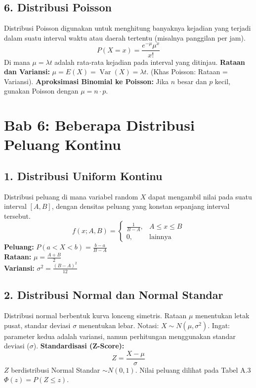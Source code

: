 \documentclass[12pt, a4paper]{article}
\begin{document}
\subsection{6. Distribusi Poisson}
Distribusi Poisson digunakan untuk menghitung banyaknya kejadian yang terjadi dalam suatu interval waktu atau daerah tertentu (misalnya panggilan per jam).
$$P(X=x) = \frac{e^{-\mu} \mu^x}{x!}$$
Di mana $\mu = \lambda t$ adalah rata-rata kejadian pada interval yang ditinjau.
\textbf{Rataan dan Variansi:} $\mu = E(X) = \operatorname{Var}(X) = \lambda t$. (Khas Poisson: Rataan = Variansi).
\textbf{Aproksimasi Binomial ke Poisson:} Jika $n$ besar dan $p$ kecil, gunakan Poisson dengan $\mu = n \cdot p$.

\newpage
\section{Bab 6: Beberapa Distribusi Peluang Kontinu}

\subsection{1. Distribusi Uniform Kontinu}
Distribusi peluang di mana variabel random $X$ dapat mengambil nilai pada suatu interval $[A, B]$, dengan densitas peluang yang konstan sepanjang interval tersebut.
$$f(x; A, B) = \begin{cases} \frac{1}{B-A}, & A \le x \le B \\ 0, & \text{lainnya} \end{cases}$$
\textbf{Peluang:} $P(a < X < b) = \frac{b-a}{B-A}$ \\
\textbf{Rataan:} $\mu = \frac{A+B}{2}$ \\
\textbf{Variansi:} $\sigma^2 = \frac{(B-A)^2}{12}$

\subsection{2. Distribusi Normal dan Normal Standar}
Distribusi normal berbentuk kurva lonceng simetris. Rataan $\mu$ menentukan letak pusat, standar deviasi $\sigma$ menentukan lebar.
Notasi: $X \sim N(\mu, \sigma^2)$. Ingat: parameter kedua adalah variansi, namun perhitungan menggunakan standar deviasi ($\sigma$).
\textbf{Standardisasi (Z-Score):}
$$Z = \frac{X - \mu}{\sigma}$$
$Z$ berdistribusi Normal Standar $\sim N(0, 1)$. Nilai peluang dilihat pada Tabel A.3 $\Phi(z) = P(Z \le z)$.
\end{document}
